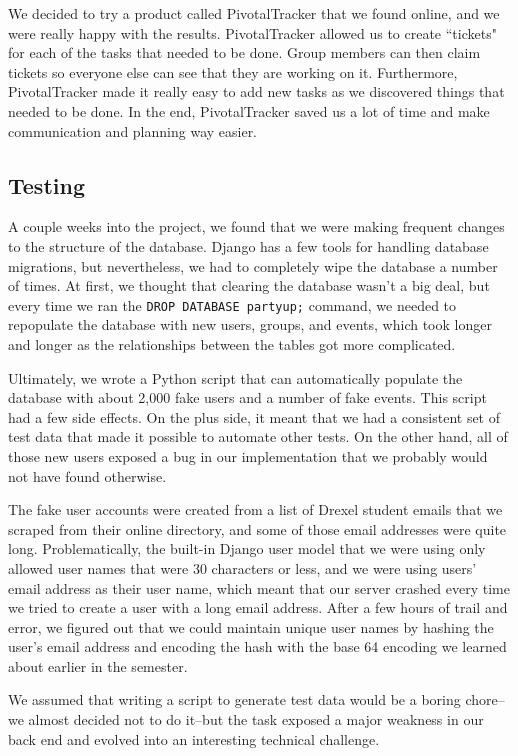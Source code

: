 \documentclass[12pt]{article}
\begin{document}
We decided to try a product called PivotalTracker that we found online,
and we were really happy with the results.
PivotalTracker allowed us to create ``tickets" for each of the tasks that needed to be done.
Group members can then claim tickets so everyone else can see that they are working on it.
Furthermore, PivotalTracker made it really easy to add new tasks as we discovered things that needed to be done.
In the end, PivotalTracker saved us a lot of time and make communication and planning way easier.

\subsection{Testing}

A couple weeks into the project, we found that we were making frequent changes to the structure of the database.
Django has a few tools for handling database migrations,
but nevertheless, we had to completely wipe the database a number of times.
At first, we thought that clearing the database wasn't a big deal, but
every time we ran the \texttt{DROP DATABASE partyup;} command,
we needed to repopulate the database with new users, groups, and events,
which took longer and longer as the relationships between the tables got more complicated.

Ultimately, we wrote a Python script that can automatically populate the database with
about 2,000 fake users and a number of fake events.
This script had a few side effects.
On the plus side, it meant that we had a consistent set of test data that made it
possible to automate other tests.
On the other hand, all of those new users exposed a bug in our implementation that we 
probably would not have found otherwise.

The fake user accounts were created from a list of Drexel student emails that
we scraped from their online directory,
and some of those email addresses were quite long.
Problematically, the built-in Django user model that we were using only allowed
user names that were 30 characters or less, and
we were using users' email address as their user name,
which meant that our server crashed every time we tried to create a user with a long email address.
After a few hours of trail and error, we figured out that we could maintain unique user names
by hashing the user's email address and encoding the hash with the base 64 encoding we learned
about earlier in the semester.

We assumed that writing a script to generate test data would be a boring chore--we almost decided not to do
it--but the task exposed a major weakness in our back end and evolved into an interesting technical challenge.
\end{document}
